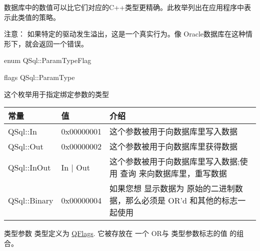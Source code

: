数据库中的数值可以比它们对应的C++类型更精确。此枚举列出在应用程序中表示此类值的策略。



注意： 如果特定的驱动发生溢出，这是一个真实行为。像 Oracle数据库在这种情形下，就会返回一个错误。


enum QSql::ParamTypeFlag


flags QSql::ParamType


这个枚举用于指定绑定参数的类型

\begin{tabular}{|l|l|l|}
	\hline
	常量	& 值 & 介绍 \\
	\hline
	QSql::In&0x00000001&这个参数被用于向数据库里写入数据\\
	\hline
	QSql::Out&0x00000002&这个参数被用于向数据库里获得数据\\
	\hline
	QSql::InOut&In | Out&这个参数被用于向数据库里写入数据;使用 查询 来向数据库里，重写数据\\
	\hline
	QSql::Binary&0x00000004&如果您想 显示数据为 原始的二进制数据，那么必须是 OR'd 和其他的标志一 起使用\\
	\hline
\end{tabular}

类型参数 类型定义为 \href{https://doc.qt.io/qt-5/qflags.html}{QFlags}. 它被存放在 一个 OR与 类型参数标志的值 的组合。




